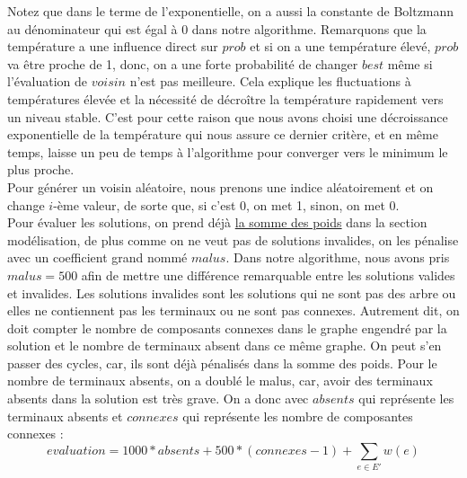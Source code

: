 \documentclass[11pt,french]{report}
\begin{document}
	Notez que dans le terme de l'exponentielle, on a aussi la constante de Boltzmann au dénominateur qui est égal à 0 dans notre algorithme. 
	Remarquons que la température a une influence direct sur $prob$ et si on a une température élevé, $prob$ va être proche de 1, donc, on a une forte probabilité de changer $best$ même si l'évaluation de $voisin$ n'est pas meilleure. Cela explique les fluctuations à températures élevée et la nécessité de décroître la température rapidement vers un niveau stable. C'est pour cette raison que nous avons choisi une décroissance exponentielle de la température qui nous assure ce dernier critère, et en même temps, laisse un peu de temps à l'algorithme pour converger vers le minimum le plus proche.\\
	
	Pour générer un voisin aléatoire, nous prenons une indice aléatoirement et on change $i$-ème valeur, de sorte que, si c'est 0, on met 1, sinon, on met 0.\\
	
	Pour évaluer les solutions, on prend déjà \hyperref[poids]{la somme des poids} dans la section modélisation, de plus comme on ne veut pas de solutions invalides, on les pénalise avec un coefficient grand nommé $malus$. Dans notre algorithme, nous avons pris $malus = 500$ afin de mettre une différence remarquable entre les solutions valides et invalides. Les solutions invalides sont les solutions qui ne sont pas des arbre ou elles ne contiennent pas les terminaux ou ne sont pas connexes. Autrement dit, on doit compter le nombre de composants connexes dans le graphe engendré par la solution et le nombre de terminaux absent dans ce même graphe. On peut s'en passer des cycles, car, ils sont déjà pénalisés dans la somme des poids. Pour le nombre de terminaux absents, on a doublé le malus, car, avoir des terminaux absents dans la solution est très grave. On a donc avec $absents$ qui représente les terminaux absents et $connexes$ qui représente les nombre de composantes connexes : 
	$$
	evaluation = 1000*absents + 500*(connexes-1)+ \sum_{e\in E'}w(e)
	$$\\
	
\end{document}
